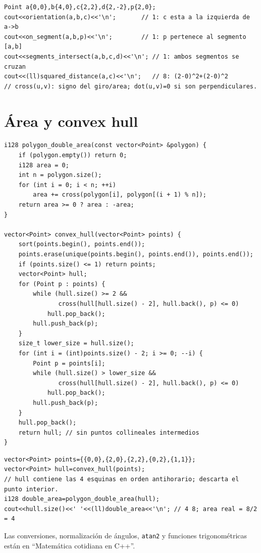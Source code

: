 \begin{lstlisting}[style=cpp]
Point a{0,0},b{4,0},c{2,2},d{2,-2},p{2,0};
cout<<orientation(a,b,c)<<'\n';       // 1: c esta a la izquierda de a->b
cout<<on_segment(a,b,p)<<'\n';        // 1: p pertenece al segmento [a,b]
cout<<segments_intersect(a,b,c,d)<<'\n'; // 1: ambos segmentos se cruzan
cout<<(ll)squared_distance(a,c)<<'\n';   // 8: (2-0)^2+(2-0)^2
// cross(u,v): signo del giro/area; dot(u,v)=0 si son perpendiculares.
\end{lstlisting}

\section{\'Area y convex hull}

\begin{lstlisting}[style=cpp]
i128 polygon_double_area(const vector<Point> &polygon) {
    if (polygon.empty()) return 0;
    i128 area = 0;
    int n = polygon.size();
    for (int i = 0; i < n; ++i)
        area += cross(polygon[i], polygon[(i + 1) % n]);
    return area >= 0 ? area : -area;
}

vector<Point> convex_hull(vector<Point> points) {
    sort(points.begin(), points.end());
    points.erase(unique(points.begin(), points.end()), points.end());
    if (points.size() <= 1) return points;
    vector<Point> hull;
    for (Point p : points) {
        while (hull.size() >= 2 &&
               cross(hull[hull.size() - 2], hull.back(), p) <= 0)
            hull.pop_back();
        hull.push_back(p);
    }
    size_t lower_size = hull.size();
    for (int i = (int)points.size() - 2; i >= 0; --i) {
        Point p = points[i];
        while (hull.size() > lower_size &&
               cross(hull[hull.size() - 2], hull.back(), p) <= 0)
            hull.pop_back();
        hull.push_back(p);
    }
    hull.pop_back();
    return hull; // sin puntos collineales intermedios
}
\end{lstlisting}

\begin{lstlisting}[style=cpp]
vector<Point> points={{0,0},{2,0},{2,2},{0,2},{1,1}};
vector<Point> hull=convex_hull(points);
// hull contiene las 4 esquinas en orden antihorario; descarta el punto interior.
i128 double_area=polygon_double_area(hull);
cout<<hull.size()<<' '<<(ll)double_area<<'\n'; // 4 8; area real = 8/2 = 4
\end{lstlisting}


Las conversiones, normalizaci\'on de \'angulos, \texttt{atan2} y funciones
trigonom\'etricas est\'an en ``Matem\'atica cotidiana en C++''.
